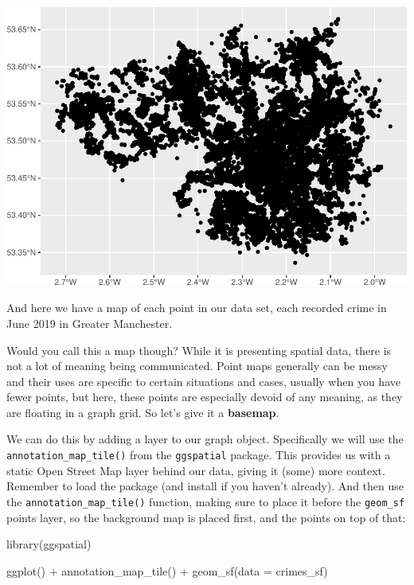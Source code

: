 \documentclass[
]{book}
\makeatletter
\newenvironment{Shaded}{\begin{snugshade}}{\end{snugshade}}
\newcommand{\AttributeTok}[1]{\textcolor[rgb]{0.61,0.61,0.61}{#1}}
\newcommand{\FunctionTok}[1]{\textcolor[rgb]{0,0,0}{#1}}
\newcommand{\NormalTok}[1]{#1}
\newcommand{\SpecialCharTok}[1]{\textcolor[rgb]{0,0,0}{#1}}
\newenvironment{kframe}{%
\medskip{}
\setlength{\fboxsep}{.8em}
 \def\at@end@of@kframe{}%
 \ifinner\ifhmode%
  \def\at@end@of@kframe{\end{minipage}}%
  \begin{minipage}{\columnwidth}%
 \fi\fi%
 \def\FrameCommand##1{\hskip\@totalleftmargin \hskip-\fboxsep
 \colorbox{shadecolor}{##1}\hskip-\fboxsep
     \hskip-\linewidth \hskip-\@totalleftmargin \hskip\columnwidth}%
 \MakeFramed {\advance\hsize-\width
   \@totalleftmargin\z@ \linewidth\hsize
   \@setminipage}}%
 {\par\unskip\endMakeFramed%
 \at@end@of@kframe}
\renewenvironment{Shaded}{\begin{kframe}}{\end{kframe}}
\makeatother
\begin{document}
\includegraphics{crime_mapping_files/figure-latex/unnamed-chunk-14-1.pdf}

And here we have a map of each point in our data set, each recorded crime in June 2019 in Greater Manchester.

Would you call this a map though? While it is presenting spatial data, there is not a lot of meaning being communicated. Point maps generally can be messy and their uses are specific to certain situations and cases, usually when you have fewer points, but here, these points are especially devoid of any meaning, as they are floating in a graph grid. So let's give it a \textbf{basemap}.

We can do this by adding a layer to our graph object. Specifically we will use the \texttt{annotation\_map\_tile()} from the \texttt{ggspatial} package. This provides us with a static Open Street Map layer behind our data, giving it (some) more context. Remember to load the package (and install if you haven't already). And then use the \texttt{annotation\_map\_tile()} function, making sure to place it before the \texttt{geom\_sf} points layer, so the background map is placed first, and the points on top of that:

\begin{Shaded}
\begin{Highlighting}[]
\FunctionTok{library}\NormalTok{(ggspatial)}

\FunctionTok{ggplot}\NormalTok{() }\SpecialCharTok{+} 
 \FunctionTok{annotation\_map\_tile}\NormalTok{() }\SpecialCharTok{+}
  \FunctionTok{geom\_sf}\NormalTok{(}\AttributeTok{data =}\NormalTok{ crimes\_sf)}
\end{Highlighting}
\end{Shaded}
\end{document}
